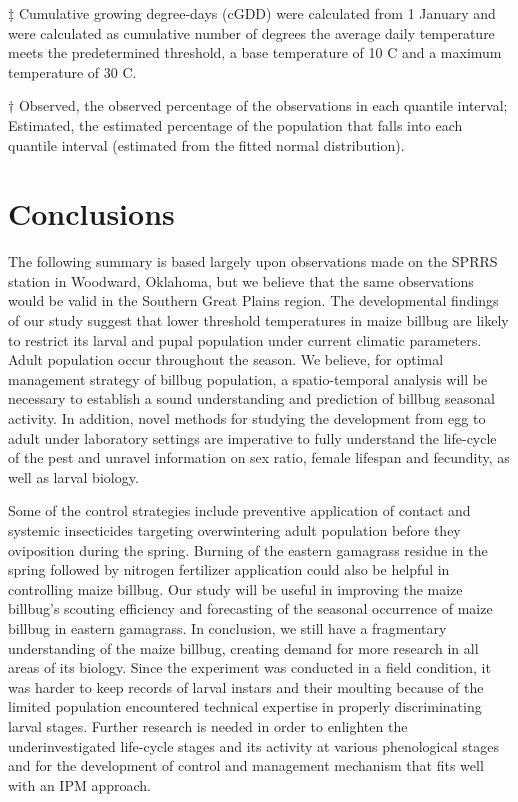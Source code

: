 \documentclass[agronomy,article,submit,moreauthors,pdftex,10pt,a4paper]{mdpi}
\theoremstyle{mdpi}
\newcounter{ex}
\newcounter{re}
\theoremstyle{mdpidefinition}
\begin{document}
\begin{table}
\begin{threeparttable}
\begin{tablenotes}
            
\vspace{5 pt} 
            
            \item{$\ddagger$} Cumulative growing degree-days (cGDD) were calculated from 1 January and were calculated as cumulative number of degrees the average daily temperature meets the predetermined threshold, a base temperature of 10 \degree C and a maximum temperature of 30 \degree C.
            \vspace{7 pt} 
            \item{$\dagger$} Observed, the observed percentage of the observations in each quantile interval; Estimated, the estimated percentage of the population that falls into each quantile interval (estimated from the fitted normal distribution).
           
        \end{tablenotes}
\end{threeparttable}
\end{table}
\section{Conclusions}

The following summary is based largely upon observations made on the SPRRS station in Woodward, Oklahoma, but we believe that the same observations would be valid in the Southern Great Plains region. The developmental findings of our study suggest that lower threshold temperatures in maize billbug are likely to restrict its larval and pupal population under current climatic parameters. Adult population occur throughout the season. We believe, for optimal management strategy of billbug population, a spatio-temporal analysis will be necessary to establish a sound understanding and prediction of billbug seasonal activity. In addition, novel methods for studying the development from egg to adult under laboratory settings are imperative to fully understand the life-cycle of the pest and unravel information on sex ratio, female lifespan and fecundity, as well as larval biology.

Some of the control strategies include preventive application of contact and systemic insecticides targeting overwintering adult population before they oviposition during the spring. Burning of the eastern gamagrass residue in the spring followed by nitrogen fertilizer application could also be helpful in controlling maize billbug. Our study will be useful in improving the maize billbug’s scouting efficiency and forecasting of the seasonal occurrence of maize billbug in eastern gamagrass. In conclusion, we still have a fragmentary understanding of the maize billbug, creating demand for more research in all areas of its biology. Since the experiment was conducted in a field condition, it was harder to keep records of larval instars and their moulting because of the limited population encountered technical expertise in properly discriminating larval stages. Further research is needed in order to enlighten the underinvestigated life-cycle stages and its activity at various phenological stages and for the development of control and management mechanism that fits well with an IPM approach.
\end{document}
